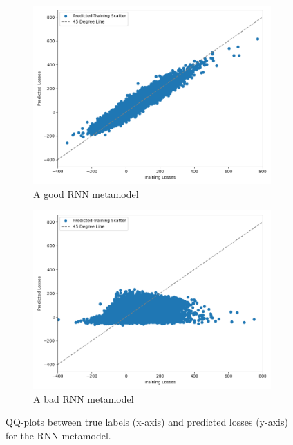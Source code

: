 \begin{figure}[ht!]
    \centering
    \begin{subfigure}{0.48\textwidth}
        \includegraphics[width=\textwidth]{./project2/figures/2a_QQ_good_training.png}
        \caption{A good RNN metamodel}
    \end{subfigure}\hfill
    \begin{subfigure}{0.48\textwidth}
        \includegraphics[width=\textwidth]{./project2/figures/2b_QQ_bad_training.png}
        \caption{A bad RNN metamodel}
        \label{subfig2:badRNN}
    \end{subfigure}
    \caption{QQ-plots between true labels (x-axis) and predicted losses (y-axis) for the RNN metamodel.} 
    \label{fig2:QQ_RNN}
\end{figure}

